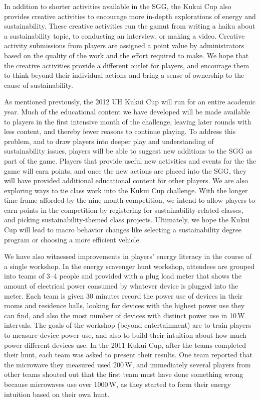 \documentclass{sigchi}
\begin{document}
In addition to shorter activities available in the SGG, the Kukui Cup also provides creative activities to encourage more in-depth explorations of energy and sustainability. These creative activities run the gamut from writing a haiku about a sustainability topic, to conducting an interview, or making a video. Creative activity submissions from players are assigned a point value by administrators based on the quality of the work and the effort required to make. We hope that the creative activities provide a different outlet for players, and encourage them to think beyond their individual actions and bring a sense of ownership to the cause of sustainability.

As mentioned previously, the 2012 UH Kukui Cup will run for an entire academic year. Much of the educational content we have developed will be made available to players in the first intensive month of the challenge, leaving later rounds with less content, and thereby fewer reasons to continue playing. To address this problem, and to draw players into deeper play and understanding of sustainability issues, players will be able to suggest new additions to the SGG as part of the game. Players that provide useful new activities and events for the the game will earn points, and once the new actions are placed into the SGG, they will have provided additional educational content for other players. We are also exploring ways to tie class work into the Kukui Cup challenge. With the longer time frame afforded by the nine month competition, we intend to allow players to earn points in the competition by registering for sustainability-related classes, and picking sustainability-themed class projects. Ultimately, we hope the Kukui Cup will lead to macro behavior changes like selecting a sustainability degree program or choosing a more efficient vehicle.

We have also witnessed improvements in players' energy literacy in the course of a single workshop. In the energy scavenger hunt workshop, attendees are grouped into teams of 3--4 people and provided with a plug load meter that shows the amount of electrical power consumed by whatever device is plugged into the meter. Each team is given 30 minutes record the power use of devices in their rooms and residence halls, looking for devices with the highest power use they can find, and also the most number of devices with distinct power use in 10\,W intervals. The goals of the workshop (beyond entertainment) are to train players to measure device power use, and also to build their intuition about how much power different devices use. In the 2011 Kukui Cup, after the teams completed their hunt, each team was asked to present their results. One team reported that the microwave they measured used 200\,W, and immediately several players from other teams shouted out that the first team must have done something wrong because microwaves use over 1000\,W, as they started to form their energy intuition based on their own hunt.
\end{document}
